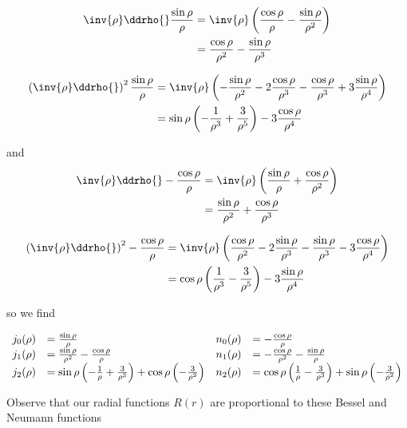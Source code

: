 \begin{align*}
\inv{\rho} \ddrho{} \frac{\sin\rho}{\rho} 
&= \inv{\rho} \left( 
\frac{\cos\rho}{\rho} 
-\frac{\sin\rho}{\rho^2} 
\right) \\
&= 
\frac{\cos\rho}{\rho^2} 
-\frac{\sin\rho}{\rho^3} 
\end{align*}

\begin{align*}
\left( \inv{\rho} \ddrho{} \right)^2 \frac{\sin\rho}{\rho} 
&= \inv{\rho} \left( 
-\frac{\sin\rho}{\rho^2} 
-2\frac{\cos\rho}{\rho^3} 
-\frac{\cos\rho}{\rho^3} 
+3\frac{\sin\rho}{\rho^4} 
\right) \\
&= 
\sin\rho\left(
-\frac{1}{\rho^3} 
+\frac{3}{\rho^5} 
\right)
-3\frac{\cos\rho}{\rho^4} 
\end{align*}

and
\begin{align*}
\inv{\rho} \ddrho{} -\frac{\cos\rho}{\rho} 
&= \inv{\rho} \left( 
\frac{\sin\rho}{\rho} 
+\frac{\cos\rho}{\rho^2} 
\right) \\
&= 
\frac{\sin\rho}{\rho^2} 
+\frac{\cos\rho}{\rho^3} 
\end{align*}

\begin{align*}
\left( \inv{\rho} \ddrho{} \right)^2 -\frac{\cos\rho}{\rho} 
&= \inv{\rho} \left( 
\frac{\cos\rho}{\rho^2} 
-2\frac{\sin\rho}{\rho^3} 
-\frac{\sin\rho}{\rho^3} 
-3\frac{\cos\rho}{\rho^4} 
\right) \\
&= 
\cos\rho\left(
\frac{1}{\rho^3} 
-\frac{3}{\rho^5} 
\right)
-3\frac{\sin\rho}{\rho^4} 
\end{align*}

so we find

\begin{equation}\label{eqn:qmTwoL23:340}
\begin{array}{l l l l}
j_0(\rho) &= \frac{\sin\rho}{\rho} 					& n_0(\rho) &= -\frac{\cos\rho}{\rho} 	\\
j_1(\rho) &= \frac{\sin\rho}{\rho^2} -\frac{\cos\rho}{\rho} 		& n_1(\rho) &= -\frac{\cos\rho}{\rho^2} -\frac{\sin\rho}{\rho} \\
j_2(\rho) &= \sin\rho \left(-\frac{1}{\rho} + \frac{3}{\rho^3} \right) +\cos\rho \left(-\frac{3}{\rho^2} \right)
& n_2(\rho) &= \cos\rho \left(\frac{1}{\rho} - \frac{3}{\rho^3} \right) +\sin\rho \left(-\frac{3}{\rho^2} \right)
\end{array}
\end{equation}

Observe that our radial functions $R(r)$ are proportional to these Bessel and Neumann functions

